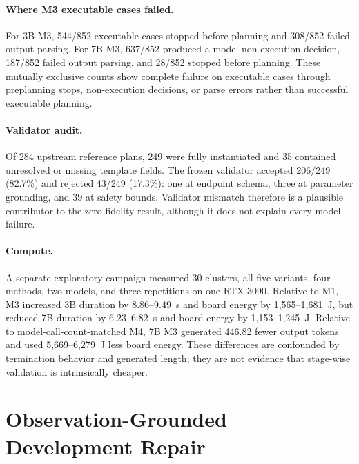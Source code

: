 \documentclass{article}
\newcommand{\Mone}{\textsc{M1}\xspace}
\newcommand{\Mthree}{\textsc{M3}\xspace}
\newcommand{\Mfour}{\textsc{M4}\xspace}
\begin{document}
\paragraph{Where \Mthree executable cases failed.}
For 3B \Mthree, 544/852 executable cases stopped before planning and 308/852
failed output parsing. For 7B \Mthree, 637/852 produced a model non-execution
decision, 187/852 failed output parsing, and 28/852 stopped before planning.
These mutually exclusive counts show complete failure on executable cases
through preplanning stops, non-execution decisions, or parse errors rather than
successful executable planning.

\paragraph{Validator audit.}
Of 284 upstream reference plans, 249 were fully instantiated and 35 contained
unresolved or missing template fields. The frozen validator accepted 206/249
(82.7\%) and rejected 43/249 (17.3\%): one at endpoint schema, three at
parameter grounding, and 39 at safety bounds. Validator mismatch therefore
is a plausible contributor to the zero-fidelity result, although it does not
explain every model failure.

\paragraph{Compute.}
A separate exploratory campaign measured 30 clusters, all five variants, four
methods, two models, and three repetitions on one RTX 3090. Relative to \Mone,
\Mthree increased 3B duration by 8.86--9.49~s and board energy by
1,565--1,681~J, but reduced 7B duration by 6.23--6.82~s and board energy by
1,153--1,245~J. Relative to model-call-count-matched \Mfour, 7B \Mthree
generated 446.82 fewer output tokens and used 5,669--6,279~J less board energy.
These differences are confounded by termination behavior and generated length;
they are not evidence that stage-wise validation is intrinsically cheaper.

\section{Observation-Grounded Development Repair}
\end{document}
